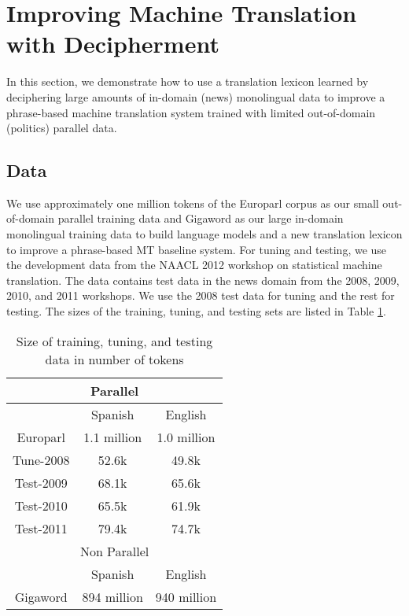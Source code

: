 \section{Improving Machine Translation with Decipherment}
In this section, we demonstrate how to use a translation lexicon learned by deciphering large amounts of in-domain (news) monolingual data to improve a phrase-based machine translation system trained with limited out-of-domain (politics) parallel data.

\subsection{Data}
We use approximately one million tokens of the Europarl corpus \cite{europarl} as our small out-of-domain parallel training data and Gigaword as our large in-domain monolingual training data to build language models and a new translation lexicon to improve a phrase-based MT baseline system. For tuning and testing, we use the development data from the NAACL 2012 workshop on statistical machine translation. The data contains test data in the news domain from the 2008, 2009, 2010, and 2011 workshops. We use the 2008 test data for tuning and the rest for testing. The sizes of the training, tuning, and testing sets are listed in Table \ref{data_size}. %


 \begin{table}
 \begin{center}
 \begin{tabular}{ |c|c|c| } \hline
    \multicolumn{3}{|c|}{Parallel}  \\ \hline
    & Spanish & English  \\ \hline
   Europarl  & 1.1 million &   1.0 million  \\ \hline

   Tune-2008 & 52.6k & 49.8k  \\ \hline
   Test-2009 & 68.1k & 65.6k  \\ \hline
   Test-2010 & 65.5k & 61.9k  \\ \hline
   Test-2011 & 79.4k & 74.7k  \\ \hline
   \multicolumn{3}{|c|}{Non Parallel}  \\ \hline
    & Spanish & English  \\ \hline
   Gigaword & 894 million &  940 million \\ \hline
 \end{tabular}

 \caption{Size of training, tuning, and testing data in number of tokens}
 \label{data_size}
 \end{center}
 \end{table}


